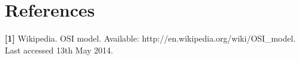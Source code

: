 
\raggedbottom


\pagestyle{empty}

\pagestyle{IHA}

\tableofcontents





%
%


\chapter{References}
\textbf{[1]} Wikipedia. OSI model. Available: http://en.wikipedia.org/wiki/OSI\_model. Last accessed 13th May 2014.\\

